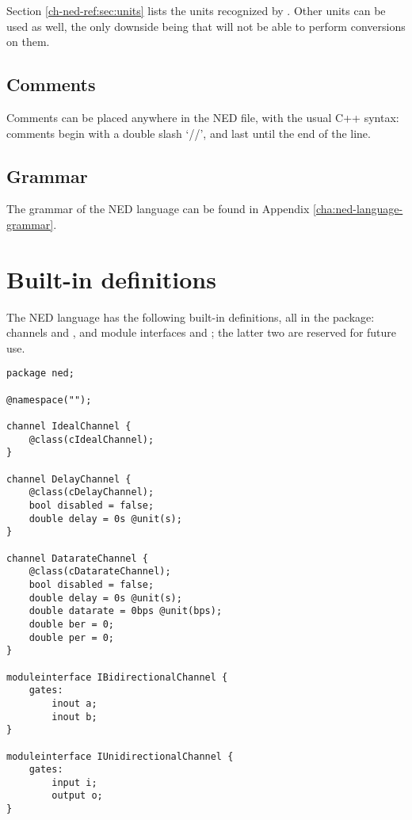 Section \ref{ch-ned-ref:sec:units} lists the units recognized by {\opp}.
Other units can be used as well, the only downside being that {\opp} will not be
able to perform conversions on them.


\subsection{Comments}

Comments can be placed anywhere in the NED file, with the usual C++
syntax: comments begin with a double slash `//', and last until
the end of the line.


\subsection{Grammar}

The grammar of the NED language can be found in Appendix
\ref{cha:ned-language-grammar}.

\section{Built-in definitions}
\label{ch-ned-ref:sec:built-in-defs}

The NED language has the following built-in definitions, all in the 
package: channels  and , and module
interfaces  and ; the
latter two are reserved for future use.

\begin{verbatim}
package ned;

@namespace("");

channel IdealChannel {
    @class(cIdealChannel);
}

channel DelayChannel {
    @class(cDelayChannel);
    bool disabled = false;
    double delay = 0s @unit(s);
}

channel DatarateChannel {
    @class(cDatarateChannel);
    bool disabled = false;
    double delay = 0s @unit(s);
    double datarate = 0bps @unit(bps);
    double ber = 0;
    double per = 0;
}

moduleinterface IBidirectionalChannel {
    gates:
        inout a;
        inout b;
}

moduleinterface IUnidirectionalChannel {
    gates:
        input i;
        output o;
}
\end{verbatim}



